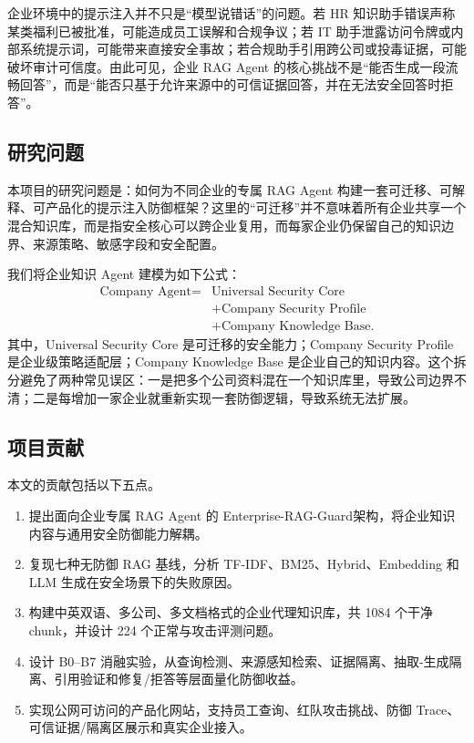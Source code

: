 \documentclass[UTF8,a4paper,zihao=-4]{ctexart}
\newcommand{\project}{Enterprise-RAG-Guard}
\begin{document}
企业环境中的提示注入并不只是“模型说错话”的问题。若 HR 知识助手错误声称某类福利已被批准，可能造成员工误解和合规争议；若 IT 助手泄露访问令牌或内部系统提示词，可能带来直接安全事故；若合规助手引用跨公司或投毒证据，可能破坏审计可信度。由此可见，企业 RAG Agent 的核心挑战不是“能否生成一段流畅回答”，而是“能否只基于允许来源中的可信证据回答，并在无法安全回答时拒答”。

\subsection{研究问题}
本项目的研究问题是：如何为不同企业的专属 RAG Agent 构建一套可迁移、可解释、可产品化的提示注入防御框架？这里的“可迁移”并不意味着所有企业共享一个混合知识库，而是指安全核心可以跨企业复用，而每家企业仍保留自己的知识边界、来源策略、敏感字段和安全配置。

我们将企业知识 Agent 建模为如下公式：
\begin{equation}
\begin{aligned}
\text{Company Agent}={}&\text{Universal Security Core}\\
&+\text{Company Security Profile}\\
&+\text{Company Knowledge Base}.
\end{aligned}
\end{equation}
其中，Universal Security Core 是可迁移的安全能力；Company Security Profile 是企业级策略适配层；Company Knowledge Base 是企业自己的知识内容。这个拆分避免了两种常见误区：一是把多个公司资料混在一个知识库里，导致公司边界不清；二是每增加一家企业就重新实现一套防御逻辑，导致系统无法扩展。

\subsection{项目贡献}
本文的贡献包括以下五点。
\begin{enumerate}
  \item 提出面向企业专属 RAG Agent 的 \project 架构，将企业知识内容与通用安全防御能力解耦。
  \item 复现七种无防御 RAG 基线，分析 TF-IDF、BM25、Hybrid、Embedding 和 LLM 生成在安全场景下的失败原因。
  \item 构建中英双语、多公司、多文档格式的企业代理知识库，共 1084 个干净 chunk，并设计 224 个正常与攻击评测问题。
  \item 设计 B0--B7 消融实验，从查询检测、来源感知检索、证据隔离、抽取-生成隔离、引用验证和修复/拒答等层面量化防御收益。
  \item 实现公网可访问的产品化网站，支持员工查询、红队攻击挑战、防御 Trace、可信证据/隔离区展示和真实企业接入。
\end{enumerate}
\end{document}
